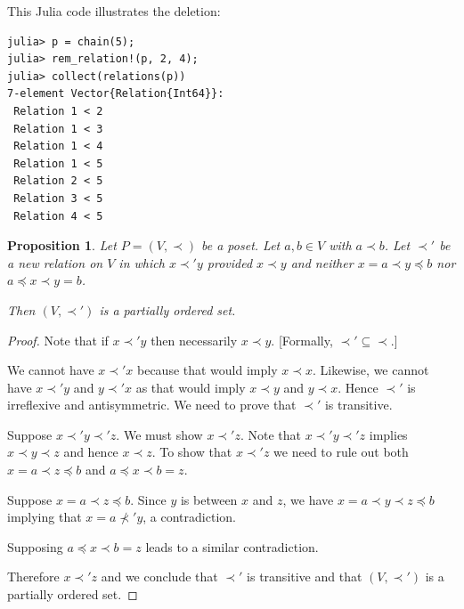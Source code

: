 \documentclass[12pt]{article}
\newtheorem{prop}{Proposition}
\begin{document}
This Julia code illustrates the deletion:
{\small
\begin{verbatim}
julia> p = chain(5);
julia> rem_relation!(p, 2, 4);
julia> collect(relations(p))
7-element Vector{Relation{Int64}}:
 Relation 1 < 2
 Relation 1 < 3
 Relation 1 < 4
 Relation 1 < 5
 Relation 2 < 5
 Relation 3 < 5
 Relation 4 < 5
\end{verbatim}
}

\begin{prop}\label{prop:ab}
  Let $P=(V,\prec)$ be a poset. Let $a,b\in V$ with $a \prec b$.
  Let $\prec'$ be a new relation on $V$ in which $x\prec'y$ provided
  $x\prec y$ and neither $x=a \prec y \preceq b$ nor 
  $a\preceq x \prec y=b$.

  Then $(V,\prec')$ is a partially ordered set.
\end{prop}


\begin{proof}
  Note that if $x\prec' y$ then necessarily $x \prec y$. [Formally,
  ${\prec'} \subseteq {\prec}$.]

  We cannot have $x \prec' x$ because that would imply $x \prec
  x$. Likewise, we cannot have $x \prec' y$ and $y\prec' x$ as that
  would imply $x\prec y$ and $y\prec x$. Hence $\prec'$ is irreflexive
  and antisymmetric. We need to prove that $\prec'$ is transitive.

  Suppose $x \prec' y \prec' z$. We must show $x \prec' z$. Note that
  $x \prec' y \prec' z$ implies $x \prec y \prec z$ and hence $x \prec
  z$. To show that $x \prec' z$ we need to rule out both $x=a\prec
  z\preceq b$ and $a\preceq x \prec b=z$.
    
  Suppose $x=a\prec z\preceq b$. Since $y$ is between $x$ and $z$, we
  have $x=a \prec y \prec z \preceq b$ implying that $x=a\not\prec'y$,
  a contradiction.

  Supposing $a\preceq x \prec b=z$ leads to a similar contradiction.

  Therefore $x \prec' z$ and we conclude that $\prec'$ is transitive
  and that $(V,\prec')$ is a partially ordered set.
\end{proof}

\bigbreak
{}
\end{document}
